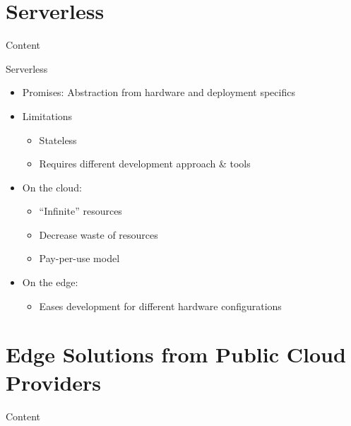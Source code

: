 \documentclass[10pt,xcolor={dvipsnames}]{beamer}
\begin{document}
\section{Serverless}
\begin{frame}{Content}{}
\tableofcontents[currentsection]
\end{frame}

\begin{frame}{Serverless}{}

\begin{itemize}
    \item Promises: Abstraction from hardware and deployment specifics
  
    \item Limitations
  \begin{itemize}
      \item Stateless
      \item Requires different development approach \& tools
  \end{itemize}
  \item On the cloud:
  \begin{itemize}
    \item ``Infinite'' resources
    \item Decrease waste of resources
    \item Pay-per-use model
  \end{itemize}
  \item On the edge:
  \begin{itemize}
    \item Eases development for different hardware configurations
  \end{itemize}


\end{itemize}
\end{frame}

\section{Edge Solutions from Public Cloud Providers}
\begin{frame}{Content}{}
\tableofcontents[currentsection]
\end{frame}
\end{document}
